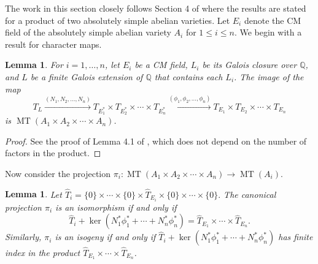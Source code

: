 \documentclass[reqno, oneside, 12pt]{amsart}
\DeclareMathOperator{\MT}{MT}
\newcommand{\Q}{\mathbb{Q}}
\newtheorem{lemma}[theorem]{Lemma}
\theoremstyle{remark}
\numberwithin{equation}{section}
\begin{document}
The work in this section closely follows Section 4 of \cite{Lombardo2021} where the results are stated for a product of two absolutely simple abelian varieties. Let $E_i$ denote the CM field of the absolutely simple abelian variety $A_i$ for $1\leq i\leq n$. We begin with a result for character maps.

\begin{lemma}\label{lemma:MTmaps1}
For $i=1,\ldots,n$, let $E_i$ be a CM field, $L_i$ be its Galois closure over $\Q$, and $L$ be a finite Galois extension of $\Q$ that contains each $L_i$.  The image of the map $$T_L \xrightarrow{(N_1, N_2, \ldots, N_n)} T_{E_1^*} \times T_{E_2^*}\times \cdots \times T_{E_n^*} \xrightarrow{(\phi_1,\phi_2, \ldots,\phi_n)} T_{E_1} \times T_{E_2} \times \cdots \times T_{E_n}$$ is $\MT(A_1 \times A_2\times \cdots \times A_n)$.
\end{lemma}
\begin{proof}
See the proof of Lemma 4.1 of \cite{Lombardo2021}, which does not depend on the number of factors in the product. 
\end{proof}

Now consider the projection  $\pi_i\colon \MT(A_1\times A_2\times \cdots \times A_n)\to \MT(A_i)$. 

\begin{lemma}\label{lemma:MTmaps2}
Let $\widehat{T}_i=\{0\}\times \cdots  \times \{0\} \times\widehat{T}_{E_i} \times \{0\}\times \cdots  \times \{0\}.$ The canonical projection $\pi_i$ is an isomorphism if and only if 
\[
\widehat{T}_i + \ker (N_1^* \phi_1^* + \cdots + N_n^*\phi_n^*) = \widehat{T}_{E_1} \times  \cdots \times \widehat{T}_{E_n}.
\]
Similarly, $\pi_i$ is an isogeny if and only if $\widehat{T}_i + \ker (N_1^* \phi_1^* + \cdots + N_n^*\phi_n^*)$ has finite index in the product $ \widehat{T}_{E_1} \times  \cdots \times \widehat{T}_{E_n}$.
\end{lemma}
\end{document}

